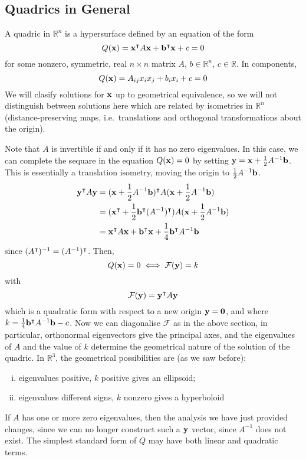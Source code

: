 \subsection{Quadrics in General}
A quadric in \(\mathbb R^n\) is a hypersurface defined by an equation of the form
\[
	Q(\vb x) = \vb x^\intercal A \vb x + \vb b^\intercal \vb x + c = 0
\]
for some nonzero, symmetric, real \(n \times n\) matrix \(A\), \(b \in \mathbb R^n\), \(c \in \mathbb R\).
In components,
\[
	Q(\vb x) = A_{ij}x_i x_j + b_i x_i + c = 0
\]
We will clasify solutions for \(\vb x\) up to geometrical equivalence, so we will not distinguish between solutions here which are related by isometries in \(\mathbb R^n\) (distance-preserving maps, i.e.\ translations and orthogonal transformations about the origin).

Note that \(A\) is invertible if and only if it has no zero eigenvalues.
In this case, we can complete the sequare in the equation \(Q(\vb x) = 0\) by setting \(\vb y = \vb x + \frac{1}{2}A^{-1} \vb b\).
This is essentially a translation isometry, moving the origin to \(\frac{1}{2}A^{-1} \vb b\).
\begin{align*}
	\vb y^\intercal A \vb y & = (\vb x + \frac{1}{2}A^{-1}\vb b)^\intercal A (\vb x + \frac{1}{2}A^{-1}\vb b)                         \\
	                         & = (\vb x^\intercal + \frac{1}{2}\vb b^\intercal(A^{-1})^\intercal) A (\vb x + \frac{1}{2}A^{-1}\vb b) \\
	                         & = \vb x^\intercal A \vb x + \vb b^\intercal \vb x + \frac{1}{4}\vb b^\intercal A^{-1}\vb b
\end{align*}
since \((A^\intercal)^{-1} = (A^{-1})^\intercal\).
Then,
\[
	Q(\vb x) = 0 \iff \mathcal F(\vb y) = k
\]
with
\[
	\mathcal F(\vb y) = \vb y^\intercal A \vb y
\]
which is a quadratic form with respect to a new origin \(\vb y = \vb 0\), and where \(k = \frac{1}{4}\vb b^\intercal A^{-1}\vb b - c\).
Now we can diagonalise \(\mathcal F\) as in the above section, in particular, orthonormal eigenvectors give the principal axes, and the eigenvalues of \(A\) and the value of \(k\) determine the geometrical nature of the solution of the quadric.
In \(\mathbb R^3\), the geometrical possibilities are (as we saw before):
\begin{enumerate}[(i)]
	\item eigenvalues positive, \(k\) positive gives an ellipsoid;
	\item eigenvalues different signs, \(k\) nonzero gives a hyperboloid
\end{enumerate}
If \(A\) has one or more zero eigenvalues, then the analysis we have just provided changes, since we can no longer construct such a \(\vb y\) vector, since \(A^{-1}\) does not exist.
The simplest standard form of \(Q\) may have both linear and quadratic terms.

